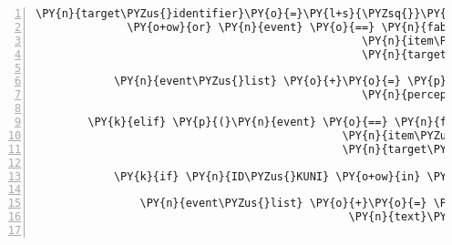 \begin{Verbatim}[commandchars=\\\{\},numbers=left,firstnumber=1,stepnumber=1]
                                                  \PY{n}{target\PYZus{}identifier}\PY{o}{=}\PY{l+s}{\PYZsq{}}\PY{l+s}{teleport\PYZus{}room\PYZus{}cassandra}\PY{l+s}{\PYZsq{}}\PY{p}{)}
              \PY{o+ow}{or} \PY{n}{event} \PY{o}{==} \PY{n}{fabula}\PY{o}{.}\PY{n}{TriesToDropEvent}\PY{p}{(}\PY{n}{identifier}\PY{o}{=}\PY{n}{ID\PYZus{}KUNI}\PY{p}{,}
                                                  \PY{n}{item\PYZus{}identifier}\PY{o}{=}\PY{l+s}{\PYZsq{}}\PY{l+s}{string\PYZus{}harp}\PY{l+s}{\PYZsq{}}\PY{p}{,}
                                                  \PY{n}{target\PYZus{}identifier}\PY{o}{=}\PY{l+s}{\PYZsq{}}\PY{l+s}{teleport\PYZus{}room\PYZus{}kuni}\PY{l+s}{\PYZsq{}}\PY{p}{)}\PY{p}{)}\PY{p}{:}

            \PY{n}{event\PYZus{}list} \PY{o}{+}\PY{o}{=} \PY{p}{[}\PY{n}{fabula}\PY{o}{.}\PY{n}{PerceptionEvent}\PY{p}{(}\PY{n}{identifier}\PY{o}{=}\PY{n}{ID\PYZus{}KUNI}\PY{p}{,}
                                                  \PY{n}{perception}\PY{o}{=}\PY{l+s}{\PYZsq{}}\PY{l+s}{Das möchte ich hier nicht ablegen.}\PY{l+s}{\PYZsq{}}\PY{p}{)}\PY{p}{]}

        \PY{k}{elif} \PY{p}{(}\PY{n}{event} \PY{o}{==} \PY{n}{fabula}\PY{o}{.}\PY{n}{TriesToDropEvent}\PY{p}{(}\PY{n}{identifier}\PY{o}{=}\PY{n}{ID\PYZus{}CASSANDRA}\PY{p}{,}
                                               \PY{n}{item\PYZus{}identifier}\PY{o}{=}\PY{l+s}{\PYZsq{}}\PY{l+s}{lute}\PY{l+s}{\PYZsq{}}\PY{p}{,}
                                               \PY{n}{target\PYZus{}identifier}\PY{o}{=}\PY{l+s}{\PYZsq{}}\PY{l+s}{guardian}\PY{l+s}{\PYZsq{}}\PY{p}{)}\PY{p}{)}\PY{p}{:}

            \PY{k}{if} \PY{n}{ID\PYZus{}KUNI} \PY{o+ow}{in} \PY{n}{room}\PY{o}{.}\PY{n}{entity\PYZus{}locations}\PY{o}{.}\PY{n}{keys}\PY{p}{(}\PY{p}{)}\PY{p}{:}

                \PY{n}{event\PYZus{}list} \PY{o}{+}\PY{o}{=} \PY{p}{[}\PY{n}{fabula}\PY{o}{.}\PY{n}{SaysEvent}\PY{p}{(}\PY{n}{identifier}\PY{o}{=}\PY{l+s}{\PYZsq{}}\PY{l+s}{guardian}\PY{l+s}{\PYZsq{}}\PY{p}{,}
                                                \PY{n}{text}\PY{o}{=}\PY{l+s}{\PYZsq{}}\PY{l+s}{Oh ihr seid die besten, ich kann endlich wieder muszierend umherziehen!}\PY{l+s}{\PYZsq{}}\PY{p}{)}\PY{p}{]}


\end{Verbatim}
